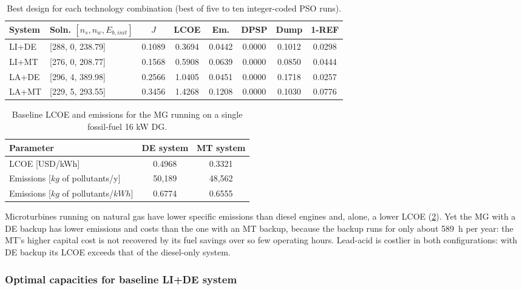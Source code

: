 \documentclass[final,3p,times]{elsarticle}
\begin{document}
\begin{table}[htbp]
\centering
\small
\begin{tabular}{l l c c c c c c}
\toprule
\textbf{System} & \textbf{Soln. $[n_s, n_w, E_{b,init}]$} & \textbf{$J$} & \textbf{LCOE} & \textbf{Em.} & \textbf{DPSP} & \textbf{Dump} & \textbf{1-REF} \\
\midrule
LI+DE & [288, 0, 238.79] & 0.1089 & 0.3694 & 0.0442 & 0.0000 & 0.1012 & 0.0298 \\
LI+MT & [276, 0, 208.77] & 0.1568 & 0.5908 & 0.0639 & 0.0000 & 0.0850 & 0.0444 \\
LA+DE & [296, 4, 389.98] & 0.2566 & 1.0405 & 0.0451 & 0.0000 & 0.1718 & 0.0257 \\
LA+MT & [229, 5, 293.55] & 0.3456 & 1.4268 & 0.1208 & 0.0000 & 0.1030 & 0.0776 \\
\bottomrule
\end{tabular}
\caption{\label{tab:tech_select} Best design for each technology combination (best of five to ten integer-coded PSO runs).}
\end{table}

\begin{table}[htbp]
\centering
\begin{tabular}{@{}lcc@{}}
\toprule
\textbf{Parameter} & DE system & MT system \\ 
\midrule
LCOE [USD/kWh] & 0.4968 & 0.3321 \\
Emissions [$kg$ of pollutants/y] & 50,189 & 48,562 \\
Emissions [$kg$ of pollutants/$kWh$] & 0.6774 & 0.6555 \\
\bottomrule
\end{tabular}
\caption{\label{tab:baseline} Baseline LCOE and emissions for the MG running on a single fossil-fuel 16 kW DG.}
\end{table}

Microturbines running on natural gas have lower specific emissions than diesel engines and, alone, a lower LCOE (\cref{tab:baseline}). Yet the MG with a DE backup has lower emissions and costs than the one with an MT backup, because the backup runs for only about 589~h per year: the MT's higher capital cost is not recovered by its fuel savings over so few operating hours. Lead-acid is costlier in both configurations: with DE backup its LCOE exceeds that of the diesel-only system.

\subsubsection{Optimal capacities for baseline LI+DE system}
\end{document}
